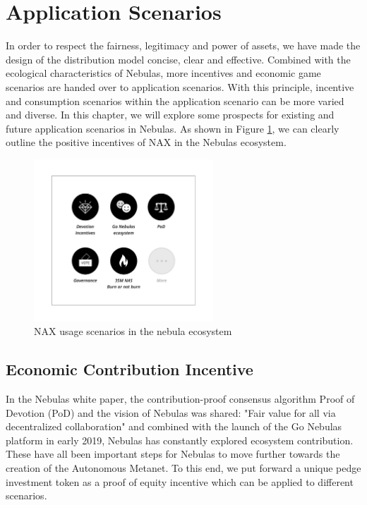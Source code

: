 \section{Application Scenarios}
In order to respect the fairness, legitimacy and power of assets, we have made the design of the distribution model concise, clear and effective. Combined with the ecological characteristics of Nebulas, more incentives and economic game scenarios are handed over to application scenarios. With this principle, incentive and consumption scenarios within the application scenario can be more varied and diverse. In this chapter, we will explore some prospects for existing and future application scenarios in Nebulas. As shown in Figure \ref{fig:nax_ecosys}, we can clearly outline the positive incentives of NAX in the Nebulas ecosystem.

\begin{figure}[h]
  \centering
  \includegraphics[width=0.6\textwidth]{../common/usecases.pdf}
  \caption{NAX usage scenarios in the nebula ecosystem\label{fig:nax_ecosys}}
\end{figure}

\subsection{Economic Contribution Incentive}
In the Nebulas white paper, the contribution-proof consensus algorithm Proof of Devotion (PoD) and the vision of Nebulas was shared: "Fair value for all via decentralized collaboration" and combined with the launch of the Go Nebulas platform in early 2019, Nebulas has constantly explored ecosystem contribution. These have all been important steps for Nebulas to move further towards the creation of the Autonomous Metanet. To this end, we put forward a unique pedge investment token as a proof of equity incentive which can be applied to different scenarios.


